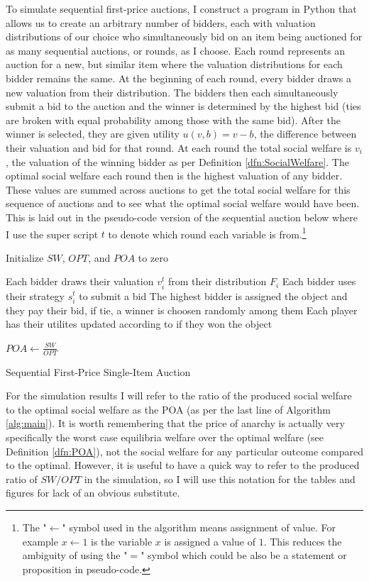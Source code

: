 \documentclass[12pt,twoside]{reedthesis}
\begin{document}
To simulate sequential first-price auctions, I construct a program in Python that allows us to create an arbitrary number of bidders, each with valuation distributions of our choice who simultaneously bid on an item being auctioned for as many sequential auctions, or rounds, as I choose. Each round represents an auction for a new, but similar item where the valuation distributions for each bidder remains the same. At the beginning of each round, every bidder draws a new valuation from their distribution. The bidders then each simultaneously submit a bid to the auction and the winner is determined by the highest bid (ties are broken with equal probability among those with the same bid). After the winner is selected, they are given utility $u(v, b) = v - b$, the difference between their valuation and bid for that round. At each round the total social welfare is $v_i$, the valuation of the winning bidder as per Definition \ref{dfn:SocialWelfare}. The optimal social welfare each round then is the highest valuation of any bidder. These values are summed across auctions to get the total social welfare for this sequence of auctions and to see what the optimal social welfare would have been. This is laid out in the pseudo-code version of the sequential auction below where I use the super script $t$ to denote which round each variable is from.\footnote{The "$\leftarrow$" symbol used in the algorithm means assignment of value. For example $x \leftarrow 1$ is the variable $x$ is assigned a value of $1$. This reduces the ambiguity of using the "$=$" symbol which could be also be a statement or proposition in pseudo-code.}\\

\begin{algorithm}[H]
	Initialize $SW$, $OPT$, and $POA$ to zero\\
	{
		Each bidder draws their valuation $v^t_i$ from their distribution $F_i$\;
		Each bidder uses their strategy $s^t_i$ to submit a bid\;
		The highest bidder is assigned the object and they pay their bid, if tie, a winner is choosen randomly among them\;
		Each player has their utilites updated according to if they won the object\;
	
		$POA \leftarrow \frac{SW}{OPT}$	
	}
\caption{Sequential First-Price Single-Item Auction}
\label{alg:main}
\end{algorithm}
\vspace{0.5cm}
For the simulation results I will refer to the ratio of the produced social welfare to the optimal social welfare as the POA (as per the last line of Algorithm \ref{alg:main}). It is worth remembering that the price of anarchy is actually very specifically the worst case equilibria welfare over the optimal welfare (see Definition \ref{dfn:POA}), not the social welfare for any particular outcome compared to the optimal. However, it is useful to have a quick way to refer to the produced ratio of $SW/OPT$ in the simulation, so I will use this notation for the tables and figures for lack of an obvious substitute.
\end{document}
